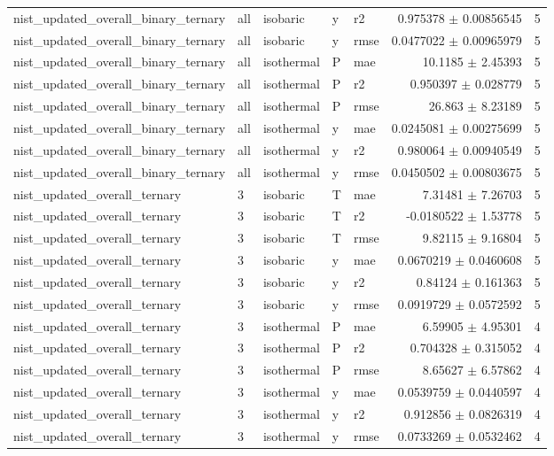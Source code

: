 \begin{tabular}{lllllrr}
nist\_updated\_overall\_binary\_ternary & all & isobaric & y & r2 & 0.975378 $\pm$ 0.00856545 & 5 \\
nist\_updated\_overall\_binary\_ternary & all & isobaric & y & rmse & 0.0477022 $\pm$ 0.00965979 & 5 \\
nist\_updated\_overall\_binary\_ternary & all & isothermal & P & mae & 10.1185 $\pm$ 2.45393 & 5 \\
nist\_updated\_overall\_binary\_ternary & all & isothermal & P & r2 & 0.950397 $\pm$ 0.028779 & 5 \\
nist\_updated\_overall\_binary\_ternary & all & isothermal & P & rmse & 26.863 $\pm$ 8.23189 & 5 \\
nist\_updated\_overall\_binary\_ternary & all & isothermal & y & mae & 0.0245081 $\pm$ 0.00275699 & 5 \\
nist\_updated\_overall\_binary\_ternary & all & isothermal & y & r2 & 0.980064 $\pm$ 0.00940549 & 5 \\
nist\_updated\_overall\_binary\_ternary & all & isothermal & y & rmse & 0.0450502 $\pm$ 0.00803675 & 5 \\
nist\_updated\_overall\_ternary & 3 & isobaric & T & mae & 7.31481 $\pm$ 7.26703 & 5 \\
nist\_updated\_overall\_ternary & 3 & isobaric & T & r2 & -0.0180522 $\pm$ 1.53778 & 5 \\
nist\_updated\_overall\_ternary & 3 & isobaric & T & rmse & 9.82115 $\pm$ 9.16804 & 5 \\
nist\_updated\_overall\_ternary & 3 & isobaric & y & mae & 0.0670219 $\pm$ 0.0460608 & 5 \\
nist\_updated\_overall\_ternary & 3 & isobaric & y & r2 & 0.84124 $\pm$ 0.161363 & 5 \\
nist\_updated\_overall\_ternary & 3 & isobaric & y & rmse & 0.0919729 $\pm$ 0.0572592 & 5 \\
nist\_updated\_overall\_ternary & 3 & isothermal & P & mae & 6.59905 $\pm$ 4.95301 & 4 \\
nist\_updated\_overall\_ternary & 3 & isothermal & P & r2 & 0.704328 $\pm$ 0.315052 & 4 \\
nist\_updated\_overall\_ternary & 3 & isothermal & P & rmse & 8.65627 $\pm$ 6.57862 & 4 \\
nist\_updated\_overall\_ternary & 3 & isothermal & y & mae & 0.0539759 $\pm$ 0.0440597 & 4 \\
nist\_updated\_overall\_ternary & 3 & isothermal & y & r2 & 0.912856 $\pm$ 0.0826319 & 4 \\
nist\_updated\_overall\_ternary & 3 & isothermal & y & rmse & 0.0733269 $\pm$ 0.0532462 & 4 \\

\end{tabular}

